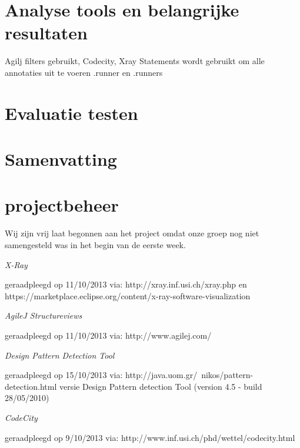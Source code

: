 \documentclass[a4paper, 11pt]{article}
\begin{document}
\section{Analyse tools en belangrijke resultaten}
Agilj filters gebruikt, Codecity, Xray
Statements wordt gebruikt om alle annotaties uit te voeren
.runner en .runners

\section{Evaluatie testen}

\section{Samenvatting}

\section{projectbeheer}

Wij zijn vrij laat begonnen aan het project omdat onze groep nog niet samengesteld was in het begin van de eerste week. 


\newpage
\begin{flushleft}
\begin{thebibliography}{4}

\textit{X-Ray}
\begin{scriptsize}
geraadpleegd op 11/10/2013 via: \mbox{http://xray.inf.usi.ch/xray.php} en \mbox{https://marketplace.eclipse.org/content/x-ray-software-visualization}
\end{scriptsize}

\textit{AgileJ Structureviews}
\begin{scriptsize}
geraadpleegd op 11/10/2013 via: \mbox{http://www.agilej.com/}
\end{scriptsize}

\textit{Design Pattern Detection Tool}
\begin{scriptsize}
geraadpleegd op 15/10/2013 via: \mbox{http://java.uom.gr/~nikos/pattern-detection.html} versie  Design Pattern detection Tool (version 4.5 - build 28/05/2010)
\end{scriptsize}

\textit{CodeCity}
\begin{scriptsize}
geraadpleegd op 9/10/2013 via: \mbox{http://www.inf.usi.ch/phd/wettel/codecity.html} 
\end{scriptsize}

\end{thebibliography}
\end{flushleft}
\end{document}
